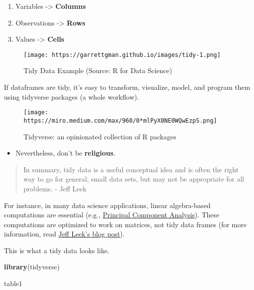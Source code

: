 \documentclass[
]{book}
\newenvironment{Shaded}{\begin{snugshade}}{\end{snugshade}}
\newcommand{\KeywordTok}[1]{\textcolor[rgb]{0.13,0.29,0.53}{\textbf{#1}}}
\newcommand{\NormalTok}[1]{#1}
\providecommand{\tightlist}{%
  \setlength{\itemsep}{0pt}\setlength{\parskip}{0pt}}
\begin{document}
\begin{enumerate}
\def\labelenumi{\arabic{enumi}.}
\tightlist
\item
  Variables -\textgreater{} \textbf{Columns}
\item
  Observations -\textgreater{} \textbf{Rows}
\item
  Values -\textgreater{} \textbf{Cells}
\end{enumerate}

\begin{figure}
\centering
\texttt{[image: https://garrettgman.github.io/images/tidy-1.png]}
\caption{Tidy Data Example (Source: R for Data Science)}
\end{figure}

If dataframes are tidy, it's easy to transform, visualize, model, and program them using tidyverse packages (a whole workflow).

\begin{figure}
\centering
\texttt{[image: https://miro.medium.com/max/960/0*mlPyX0NE0WQwEzpS.png]}
\caption{Tidyverse: an opinionated collection of R packages}
\end{figure}

\begin{itemize}
\tightlist
\item
  Nevertheless, don't be \textbf{religious}.
\end{itemize}

\begin{quote}
In summary, tidy data is a useful conceptual idea and is often the right way to go for general, small data sets, but may not be appropriate for all problems. - Jeff Leek
\end{quote}

For instance, in many data science applications, linear algebra-based computations are essential (e.g., \href{https://www.math.upenn.edu/~kazdan/312S13/JJ/PCA-JJ.pdf}{Principal Component Analysis}). These computations are optimized to work on matrices, not tidy data frames (for more information, read \href{https://simplystatistics.org/2016/02/17/non-tidy-data/}{Jeff Leek's blog post}).

This is what a tidy data looks like.

\begin{Shaded}
\begin{Highlighting}[]
\KeywordTok{library}\NormalTok{(tidyverse)}

\NormalTok{table1}
\end{Highlighting}
\end{Shaded}
\end{document}
